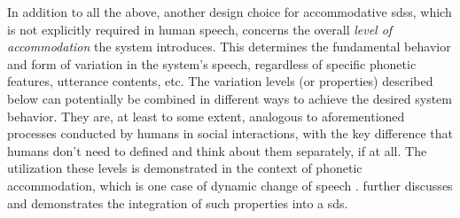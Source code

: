 In addition to all the above, another design choice for accommodative \acp{sds}, which is not explicitly required in human speech, concerns the overall \emph{level of accommodation} the system introduces.
This determines the fundamental behavior and form of variation in the system's speech, regardless of specific phonetic features, utterance contents, etc.
The variation levels (or properties) described below can potentially be combined in different ways to achieve the desired system behavior.
They are, at least to some extent, analogous to aforementioned processes conducted by humans in social interactions, with the key difference that humans don't need to defined and think about them separately, if at all.
The utilization these levels is demonstrated in the context of phonetic accommodation, which is one case of dynamic change of speech \citep[as in][to name a few]{Weise2019individual, Schweitzer2016exemplar, Bevnuvs2014social}.
 further discusses and demonstrates the integration of such properties into a \ac{sds}.

